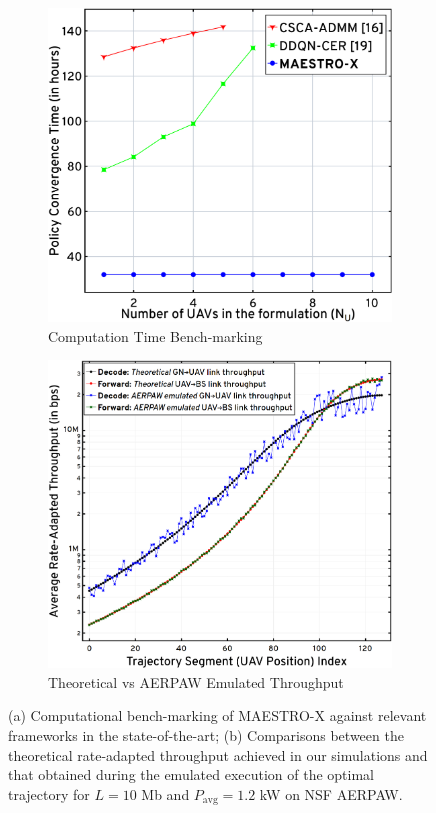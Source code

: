 \documentclass[12pt, draftcls, onecolumn]{IEEEtran}
\theoremstyle{plain}
\theoremstyle{definition}
\theoremstyle{remark}
\begin{document}
\begin{figure}[t]
	\begin{subfigure}{0.494\linewidth}
  		\centering
  		\includegraphics[width=0.9\linewidth]{figs/Computational_Complexity.png}
  		\caption{Computation Time Bench-marking}
  		\label{F10}
	\end{subfigure}
	\begin{subfigure}{0.506\linewidth}
         \centering
         \includegraphics[width=0.9\linewidth]{figs/AERPAW_Emulated_Throughput_Comparisons.png}
         \caption{Theoretical vs AERPAW Emulated Throughput}
         \label{F11}
     \end{subfigure}
	\vspace{-2mm}
	\caption{(a) Computational bench-marking of MAESTRO-X against relevant frameworks in the state-of-the-art; (b) Comparisons between the theoretical rate-adapted throughput achieved in our simulations and that obtained during the emulated execution of the optimal trajectory for $L{=}10$ Mb and $P_{\text{avg}}{=}1.2$ kW on NSF AERPAW.}
\end{figure}
\end{document}
